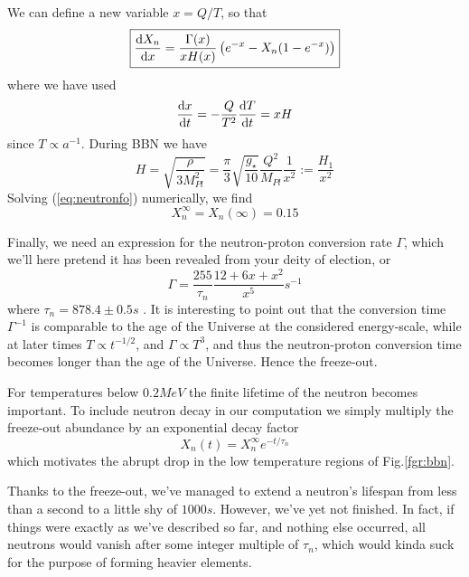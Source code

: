 We can define a new variable $x = Q/T$, so that 
\begin{equation}
    \boxed{
    \frac{\text{d}X_{n}}{\text{d}x} = \frac{\Gamma(x)}{xH(x)}\left(e^{-x}-X_{n}(1-e^{-x})\right)
    }
    \label{eq:neutronfo}
\end{equation}
where we have used 
\begin{equation}
    \frac{\text{d}x}{\text{d}t} = -\frac{Q}{T^{2}}\frac{\text{d}T}{\text{d}t} = xH
\end{equation}
since $T \propto a^{-1}$. During BBN we have 
\begin{equation}
    H = \sqrt{\frac{\rho}{3M_{Pl}^{2}}} = \frac{\pi}{3}\sqrt{\frac{g_{\star}}{10}}\frac{Q^{2}}{M_{Pl}}\frac{1}{x^{2}} := \frac{H_{1}}{x^{2}}
\end{equation}
Solving (\ref{eq:neutronfo}) numerically, we find
\begin{equation}
    X_{n}^{\infty} = X_{n}(\infty) = 0.15
\end{equation}
\par Finally, we need an expression for the neutron-proton conversion rate $\Gamma$, which we'll here pretend it has been revealed from your deity of election, or \cite{2020moco.book.....D}
\begin{equation}
    \Gamma = \frac{255}{\tau_{n}}\frac{12+6x+x^{2}}{x^{5}} \unit{s}^{-1}
\end{equation}
where $\tau_{n} = 878.4 \pm 0.5 \unit{s}$ \cite{ParticleDataGroup:2024cfk}. It is interesting to point out that the conversion time $\Gamma^{-1}$ is comparable to the age of the Universe at the considered energy-scale, while at later times $T\propto t^{-1/2}$, and $\Gamma \propto T^{3}$, and thus the neutron-proton conversion time becomes longer than the age of the Universe. Hence the freeze-out.
\par For temperatures below $0.2\unit{MeV}$ the finite lifetime of the neutron becomes important. To include neutron decay in our computation we simply multiply the freeze-out abundance by an exponential decay factor
\begin{equation}
    X_{n}(t) = X_{n}^{\infty}e^{-t/\tau_{n}}
\end{equation}
which motivates the abrupt drop in the low temperature regions of Fig.\ref{fgr:bbn}.
\par Thanks to the freeze-out, we've managed to extend a neutron's lifespan from less than a second to a little shy of $1000\unit{s}$. However, we've yet not finished. In fact, if things were exactly as we've described so far, and nothing else occurred, all neutrons would vanish after some integer multiple of $\tau_{n}$, which would kinda suck for the purpose of forming heavier elements.
